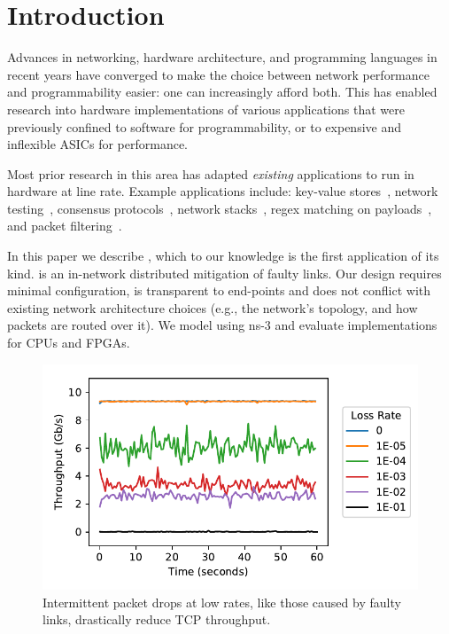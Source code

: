 \section{Introduction}
Advances in networking, hardware architecture, and programming
languages in recent years have converged to make the choice between
network performance and programmability easier: one can increasingly
afford both.
This has enabled research into hardware implementations of various
applications that were previously confined to software for
programmability, or to expensive and inflexible ASICs for performance.

Most prior research in this area has adapted \emph{existing}
applications to run in hardware at line rate.
Example applications include:
key-value stores~\cite{Li:2017:KHI:3132747.3132756},
network testing~\cite{Shahbaz:2013:AOS:2537857.2537880},
consensus protocols~\cite{Istvan:2016:CBI:2930611.2930639},
network stacks~\cite{Istvan:2016:CBI:2930611.2930639},
regex matching on payloads~\cite{Woods:2010:CED:1920841.1920926},
and packet filtering~\cite{Fiessler:2016:HVH:2881025.2881033}.

In this paper we describe \OurSys, which to our knowledge is the first application
of its kind. \OurSys is an in-network distributed
mitigation of faulty links.
Our design requires
minimal configuration, is transparent to
end-points and does not conflict
with existing network architecture choices (e.g., the network's topology,
and how packets are routed over it). We model \OurSys using ns-3 and evaluate
implementations for CPUs and FPGAs.

\begin{figure}
  \centering
  \includegraphics[width=0.3\paperwidth]{figures/timeVsTput.pdf}
  \caption{\label{fig:timeVsTput} Intermittent packet drops at low rates, like those 
  caused by faulty links, drastically reduce TCP throughput.}
\end{figure}


